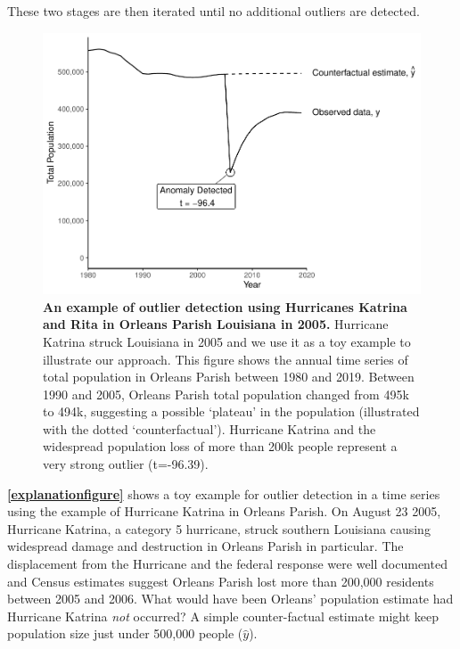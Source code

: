 \documentclass[12pt]{article}
\begin{document}
These two stages are then iterated until no additional outliers are
detected.

\begin{figure}
\centering
\includegraphics{manuscript_files/figure-latex/ToyExample-1.pdf}
\caption{\textbf{An example of outlier detection using Hurricanes Katrina and Rita in Orleans Parish Louisiana in 2005.}
Hurricane Katrina struck Louisiana in 2005 and we use it as a toy
example to illustrate our approach. This figure shows the annual time
series of total population in Orleans Parish between 1980 and 2019.
Between 1990 and 2005, Orleans Parish total population changed from 495k
to 494k, suggesting a possible `plateau' in the population (illustrated
with the dotted `counterfactual'). Hurricane Katrina and the widespread
population loss of more than 200k people represent a very strong outlier
(t=-96.39). \label{explanationfigure}}
\end{figure}

\textbf{\autoref{explanationfigure}} shows a toy example for outlier
detection in a time series using the example of Hurricane Katrina in
Orleans Parish. On August 23 2005, Hurricane Katrina, a category 5
hurricane, struck southern Louisiana causing widespread damage and
destruction in Orleans Parish in particular. The displacement from the
Hurricane and the federal response were well documented
\citep{horiDisplacementDynamicsSouthern2009, fussellRecoveryMigrationCity2014}
and Census estimates suggest Orleans Parish lost more than 200,000
residents between 2005 and 2006. What would have been Orleans'
population estimate had Hurricane Katrina \emph{not} occurred? A simple
counter-factual estimate might keep population size just under 500,000
people (\(\hat{y}\)).
\end{document}
